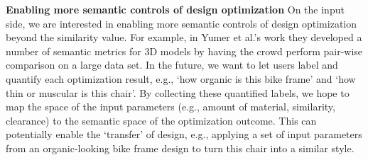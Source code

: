 \textbf{Enabling more semantic controls of design optimization}
On the input side, we are interested in enabling more semantic controls of design optimization beyond the similarity value. For example, in Yumer et al.'s work \cite{yumer2015semantic} they developed a number of semantic metrics for 3D models by having the crowd perform pair-wise comparison on a large data set. In the future, we want to let users label and quantify each optimization result, e.g., `how organic is this bike frame' and `how thin or muscular is this chair'. By collecting these quantified labels, we hope to map the space of the input parameters (e.g., amount of material, similarity, clearance) to the semantic space of the optimization outcome. This can potentially enable the `transfer' of design, e.g., applying a set of input parameters from an organic-looking bike frame design to turn this chair into a similar style.








